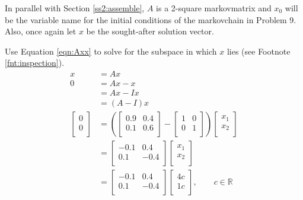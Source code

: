 \documentclass[titlepage]{article}
\begin{document}
In parallel with Section \ref{ss2:assemble}, $A$ is a 2-square \Gls{markovmatrix} and $x_0$ will be the variable name for the initial conditions of the \Gls{markovchain} in Problem 9. Also, once again let $x$ be the sought-after solution vector.\par
Use Equation \ref{eqn:Axx} to solve for the subspace in which $x$ lies (see Footnote \ref{fnt:inspection}).
\begin{align*}
    x &= Ax\\
    0 &= Ax-x\\
    &= Ax-Ix\\
    &= (A-I)x\\
    \begin{bmatrix}
        0\\
        0\\
    \end{bmatrix}
    &= \left( 
        \begin{bmatrix}
            0.9 & 0.4\\
            0.1 & 0.6\\
        \end{bmatrix}
        -
        \begin{bmatrix}
            1 & 0\\
            0 & 1\\
        \end{bmatrix}
    \right)
    \begin{bmatrix}
        x_1\\
        x_2\\
    \end{bmatrix}\\
    &=
    \begin{bmatrix}
        -0.1 & 0.4\\
        0.1 & -0.4\\
    \end{bmatrix}
    \begin{bmatrix}
        x_1\\
        x_2\\
    \end{bmatrix}\\
    &=
    \begin{bmatrix}
        -0.1 & 0.4\\
        0.1 & -0.4\\
    \end{bmatrix}
    \begin{bmatrix}
        4c\\
        1c\\
    \end{bmatrix}
    ,\qquad c\in\mathbb{R}
\end{align*}
\end{document}
